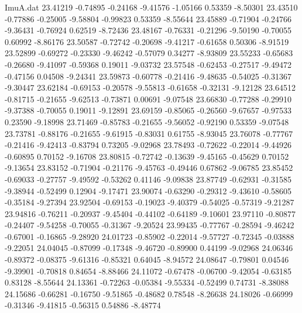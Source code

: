 \begin{filecontents}{ImuA.dat}
  23.41219   -0.74895   -0.24168   -9.41576   -1.05166    0.53359   -8.50301
  23.43510   -0.77886   -0.25005   -9.58804   -0.99823    0.53359   -8.55644
  23.45889   -0.71904   -0.24766   -9.36431   -0.76924    0.62519   -8.72436
  23.48167   -0.76331   -0.21296   -9.50190   -0.70055    0.60992   -8.86176
  23.50587   -0.72742   -0.20698   -9.41217   -0.61658    0.50306   -8.91519
  23.52899   -0.69272   -0.23330   -9.46242   -0.57079    0.34277   -8.93809
  23.55233   -0.65683   -0.26680   -9.41097   -0.59368    0.19011   -9.03732
  23.57548   -0.62453   -0.27517   -9.49472   -0.47156    0.04508   -9.24341
  23.59873   -0.60778   -0.21416   -9.48635   -0.54025   -0.31367   -9.30447
  23.62184   -0.69153   -0.20578   -9.55813   -0.61658   -0.32131   -9.12128
  23.64512   -0.81715   -0.21655   -9.62513   -0.73871    0.00691   -9.07548
  23.66830   -0.77288   -0.29910   -9.37388   -0.70055    0.19011   -9.12891
  23.69159   -0.85065   -0.26560   -9.67657   -0.97533    0.23590   -9.18998
  23.71469   -0.85783   -0.21655   -9.56052   -0.92190    0.53359   -9.07548
  23.73781   -0.88176   -0.21655   -9.61915   -0.83031    0.61755   -8.93045
  23.76078   -0.77767   -0.21416   -9.42413   -0.83794    0.73205   -9.02968
  23.78493   -0.72622   -0.22014   -9.44926   -0.60895    0.70152   -9.16708
  23.80815   -0.72742   -0.13639   -9.45165   -0.45629    0.70152   -9.13654
  23.83152   -0.71904   -0.21176   -9.45763   -0.49446    0.67862   -9.06785
  23.85452   -0.69033   -0.27757   -9.49592   -0.53262    0.41146   -9.09838
  23.87749   -0.62931   -0.31585   -9.38944   -0.52499    0.12904   -9.17471
  23.90074   -0.63290   -0.29312   -9.43610   -0.58605   -0.35184   -9.27394
  23.92504   -0.69153   -0.19023   -9.40379   -0.54025   -0.57319   -9.21287
  23.94816   -0.76211   -0.20937   -9.45404   -0.44102   -0.64189   -9.10601
  23.97110   -0.80877   -0.24407   -9.54258   -0.70055   -0.31367   -9.20524
  23.99435   -0.77767   -0.28594   -9.46242   -0.67001   -0.16865   -9.28920
  24.01723   -0.85902   -0.22014   -9.57727   -0.72345   -0.03888   -9.22051
  24.04045   -0.87099   -0.17348   -9.46720   -0.89900    0.44199   -9.02968
  24.06346   -0.89372   -0.08375   -9.61316   -0.85321    0.64045   -8.94572
  24.08647   -0.79801    0.04546   -9.39901   -0.70818    0.84654   -8.88466
  24.11072   -0.67478   -0.06700   -9.42054   -0.63185    0.83128   -8.55644
  24.13361   -0.72263   -0.05384   -9.55334   -0.52499    0.74731   -8.38088
  24.15686   -0.66281   -0.16750   -9.51865   -0.48682    0.78548   -8.26638
  24.18026   -0.66999   -0.31346   -9.41815   -0.56315    0.54886   -8.48774

\end{filecontents}
